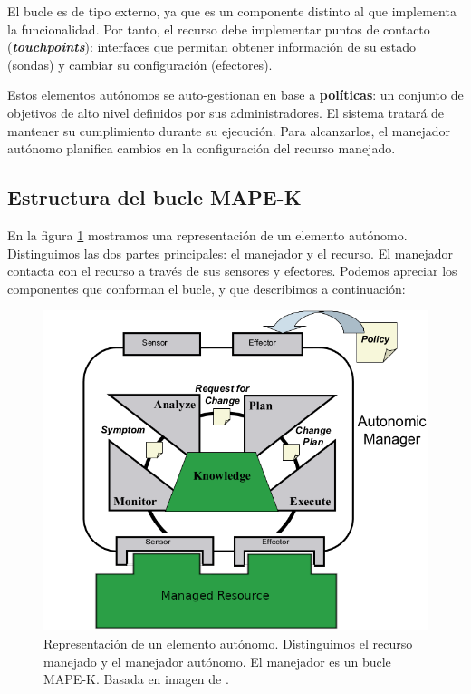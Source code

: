 El bucle es de tipo externo, ya que es un componente distinto al que implementa la funcionalidad. Por tanto, el recurso debe implementar puntos de contacto (\textbf{\emph{touchpoints}}): interfaces que permitan obtener información de su estado (sondas) y cambiar su configuración (efectores).

Estos elementos autónomos se auto-gestionan en base a \textbf{políticas}: un conjunto de objetivos de alto nivel definidos por sus administradores. El sistema tratará de mantener su cumplimiento durante su ejecución. Para alcanzarlos, el manejador autónomo planifica cambios en la configuración del recurso manejado.

\subsection{Estructura del bucle MAPE-K}

En la figura \ref{fig:autonomic-element} mostramos una representación de un elemento autónomo. Distinguimos las dos partes principales: el manejador y el recurso. El manejador contacta con el recurso a través de sus sensores y efectores. Podemos apreciar los componentes que conforman el bucle, y que describimos a continuación: \cite{ibmcorporationArchitecturalBlueprintAutonomic2006}

\begin{figure}[h]
  \centering
  \includegraphics[scale=2]{cap_contexto_tecnologico/images/autonomic-element}
  \caption[Representación de un elemento autónomo. Distinguimos el recurso manejado y el manejador autónomo. El manejador es un bucle MAPE-K (\emph{Monitor}, \emph{Analysis}, \emph{Planification}, \emph{Execution} y \emph{Knowledge})]{Representación de un elemento autónomo. Distinguimos el recurso manejado y el manejador autónomo. El manejador es un bucle MAPE-K. Basada en imagen de \cite{ibmcorporationArchitecturalBlueprintAutonomic2006}.}
  \label{fig:autonomic-element}
\end{figure}

